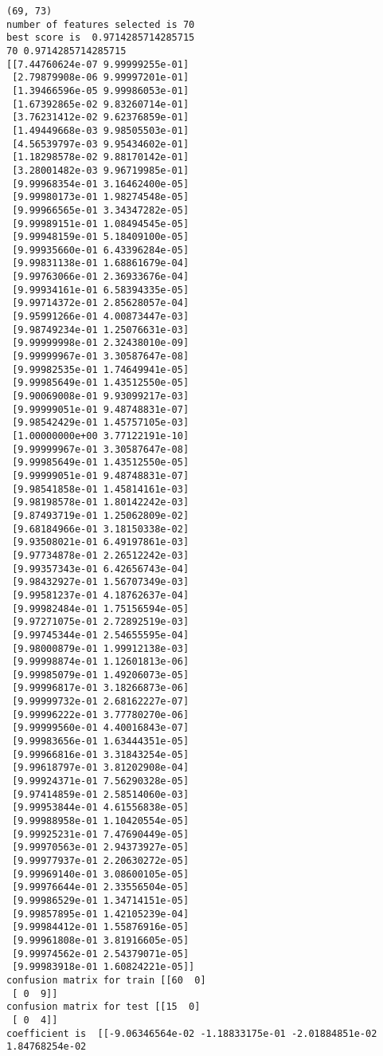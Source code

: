 \documentclass[11pt]{article}
\begin{document}
    \begin{Verbatim}[commandchars=\\\{\}]
(69, 73)
number of features selected is 70
best score is  0.9714285714285715
70 0.9714285714285715
[[7.44760624e-07 9.99999255e-01]
 [2.79879908e-06 9.99997201e-01]
 [1.39466596e-05 9.99986053e-01]
 [1.67392865e-02 9.83260714e-01]
 [3.76231412e-02 9.62376859e-01]
 [1.49449668e-03 9.98505503e-01]
 [4.56539797e-03 9.95434602e-01]
 [1.18298578e-02 9.88170142e-01]
 [3.28001482e-03 9.96719985e-01]
 [9.99968354e-01 3.16462400e-05]
 [9.99980173e-01 1.98274548e-05]
 [9.99966565e-01 3.34347282e-05]
 [9.99989151e-01 1.08494545e-05]
 [9.99948159e-01 5.18409100e-05]
 [9.99935660e-01 6.43396284e-05]
 [9.99831138e-01 1.68861679e-04]
 [9.99763066e-01 2.36933676e-04]
 [9.99934161e-01 6.58394335e-05]
 [9.99714372e-01 2.85628057e-04]
 [9.95991266e-01 4.00873447e-03]
 [9.98749234e-01 1.25076631e-03]
 [9.99999998e-01 2.32438010e-09]
 [9.99999967e-01 3.30587647e-08]
 [9.99982535e-01 1.74649941e-05]
 [9.99985649e-01 1.43512550e-05]
 [9.90069008e-01 9.93099217e-03]
 [9.99999051e-01 9.48748831e-07]
 [9.98542429e-01 1.45757105e-03]
 [1.00000000e+00 3.77122191e-10]
 [9.99999967e-01 3.30587647e-08]
 [9.99985649e-01 1.43512550e-05]
 [9.99999051e-01 9.48748831e-07]
 [9.98541858e-01 1.45814161e-03]
 [9.98198578e-01 1.80142242e-03]
 [9.87493719e-01 1.25062809e-02]
 [9.68184966e-01 3.18150338e-02]
 [9.93508021e-01 6.49197861e-03]
 [9.97734878e-01 2.26512242e-03]
 [9.99357343e-01 6.42656743e-04]
 [9.98432927e-01 1.56707349e-03]
 [9.99581237e-01 4.18762637e-04]
 [9.99982484e-01 1.75156594e-05]
 [9.97271075e-01 2.72892519e-03]
 [9.99745344e-01 2.54655595e-04]
 [9.98000879e-01 1.99912138e-03]
 [9.99998874e-01 1.12601813e-06]
 [9.99985079e-01 1.49206073e-05]
 [9.99996817e-01 3.18266873e-06]
 [9.99999732e-01 2.68162227e-07]
 [9.99996222e-01 3.77780270e-06]
 [9.99999560e-01 4.40016843e-07]
 [9.99983656e-01 1.63444351e-05]
 [9.99966816e-01 3.31843254e-05]
 [9.99618797e-01 3.81202908e-04]
 [9.99924371e-01 7.56290328e-05]
 [9.97414859e-01 2.58514060e-03]
 [9.99953844e-01 4.61556838e-05]
 [9.99988958e-01 1.10420554e-05]
 [9.99925231e-01 7.47690449e-05]
 [9.99970563e-01 2.94373927e-05]
 [9.99977937e-01 2.20630272e-05]
 [9.99969140e-01 3.08600105e-05]
 [9.99976644e-01 2.33556504e-05]
 [9.99986529e-01 1.34714151e-05]
 [9.99857895e-01 1.42105239e-04]
 [9.99984412e-01 1.55876916e-05]
 [9.99961808e-01 3.81916605e-05]
 [9.99974562e-01 2.54379071e-05]
 [9.99983918e-01 1.60824221e-05]]
confusion matrix for train [[60  0]
 [ 0  9]]
confusion matrix for test [[15  0]
 [ 0  4]]
coefficient is  [[-9.06346564e-02 -1.18833175e-01 -2.01884851e-02  1.84768254e-02

\end{Verbatim}
\end{document}
